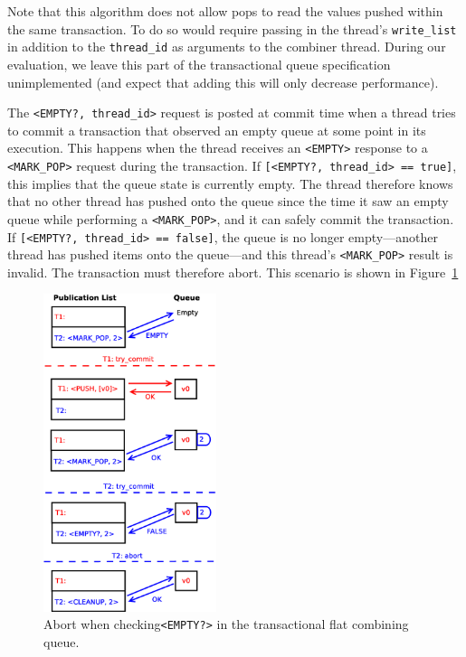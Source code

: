 Note that this algorithm does not allow pops to read the values pushed within the same transaction. To do so would require passing in the thread's \texttt{write\_list} in addition to the \texttt{thread\_id} as arguments to the combiner thread. During our evaluation, we leave this part of the transactional queue specification unimplemented (and expect that adding this will only decrease performance).

The \texttt{<EMPTY?, thread\_id>} request is posted at commit time when a thread tries to commit a transaction that observed an empty queue at some point in its execution. This happens when the thread receives an \texttt{<EMPTY>} response to a \texttt{<MARK\_POP>} request during the transaction. If \texttt{[<EMPTY?, thread\_id> == true]}, this implies that the queue state is currently empty.
The thread therefore knows that no other thread has pushed onto the queue since the time it saw an empty queue while performing a \texttt{<MARK\_POP>}, and it can safely commit the transaction. If \texttt{[<EMPTY?, thread\_id> == false]}, the queue is no longer empty---another thread has pushed items onto the queue---and this thread's \texttt{<MARK\_POP>} result is invalid. The transaction must therefore abort. This scenario is shown in Figure~\ref{fig:fcqueue_abort2}

\begin{figure}[t]
\centering
\includegraphics[width=0.45\textwidth]{fcqueue_abort2}
    \caption{Abort when checking\texttt{<EMPTY?>} in the transactional flat combining queue.}
\label{fig:fcqueue_abort2}
\end{figure}

